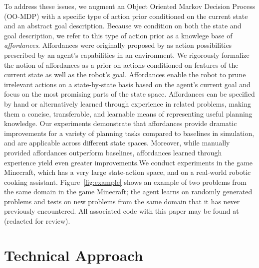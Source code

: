 \documentclass[letterpaper]{article}
\begin{document}
To address these issues, we augment an Object Oriented Markov Decision
Process (OO-MDP) with a specific type of action prior conditioned on
the current state and an abstract goal description.  Because we
condition on both the state and goal description, we refer to this
type of action prior as a knowlege base of {\em affordances}.
Affordances were originally proposed by \citet{gibson77} as action
possibilities prescribed by an agent's capabilities in an environment.
We rigorously formalize the notion of affordances as a prior on
actions conditioned on features of the current state as well as the
robot's goal.  Affordances enable the robot to prune irrelevant
actions on a state-by-state basis based on the agent's current goal
and focus on the most promising parts of the state space.  Affordances
can be specified by hand or alternatively learned through experience
in related problems, making them a concise, transferable, and
learnable means of representing useful planning knowledge. Our
experiments demonstrate that affordances provide dramatic improvements
for a variety of planning tasks compared to baselines in simulation,
and are applicable across different state spaces.  Moreover, while
manually provided affordances outperform baselines, affordances
learned through experience yield even greater improvements.We conduct
experiments in the game Minecraft, which has a very large state-action
space, and on a real-world robotic cooking assistant.
Figure~\ref{fig:example} shows an example of two problems from the
same domain in the game Minecraft; the agent learns on randomly
generated problems and tests on new problems from the same domain that
it has never previously encountered.  All associated code with this
paper may be found at (redacted for review).


\section{Technical Approach}
\label{sec:affordances}
\end{document}
